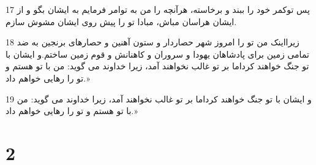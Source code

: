 \par 17 پس توکمر خود را ببند و برخاسته، هر‌آنچه را من به توامر فرمایم به ایشان بگو و از ایشان هراسان مباش، مبادا تو را پیش روی ایشان مشوش سازم.
\par 18 زیرااینک من تو را امروز شهر حصاردار و ستون آهنین و حصارهای برنجین به ضد تمامی زمین برای پادشاهان یهودا و سروران و کاهنانش و قوم زمین ساختم.و ایشان با تو جنگ خواهند کرداما بر تو غالب نخواهند آمد، زیرا خداوند می گوید: من با تو هستم و تو را رهایی خواهم داد.»
\par 19 و ایشان با تو جنگ خواهند کرداما بر تو غالب نخواهند آمد، زیرا خداوند می گوید: من با تو هستم و تو را رهایی خواهم داد.»
 
\chapter{2}

